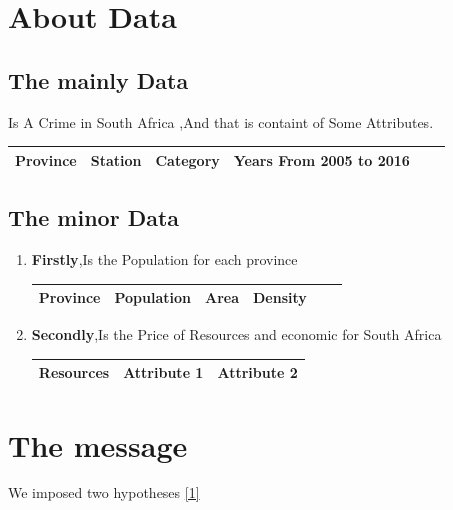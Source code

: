 \documentclass[landscape,17pt]{extarticle}
\begin{document}
\section{About Data}
\subsection {The mainly Data} 
    Is A Crime in South Africa \cite{First},And that is containt of Some Attributes.\\
	\begin{center}
	\begin{tabular}{|c| c| c| c| c| c|}
	    \hline
	    Province & Station & Category & Years From 2005 to 2016\\
        \hline
	\end{tabular}
\end{center}
\subsection {The minor Data} 
    
    \begin{enumerate}
        \item \textbf{Firstly},Is the Population for each province \cite{Second}
        	\begin{center}
	            \begin{tabular}{|c| c| c| c| c| c|}
	                \hline
	             Province & Population & Area & Density\\
                    \hline
	            \end{tabular}
            \end{center}
        \item \textbf{Secondly},Is the Price of Resources and economic for South Africa \cite{Third} 
        	\begin{center}
	\begin{tabular}{|r| c| c|}
	    \hline
	    Resources & Attribute 1
	    & Attribute 2\\
	    \hline
	\end{tabular}
	
\end{center}
    \end{enumerate}
    \newpage
\section{The message}
    We imposed two hypotheses 
\hypertarget{[1]}{\hyperlink{hypotheses}{[1]}}
\end{document}
